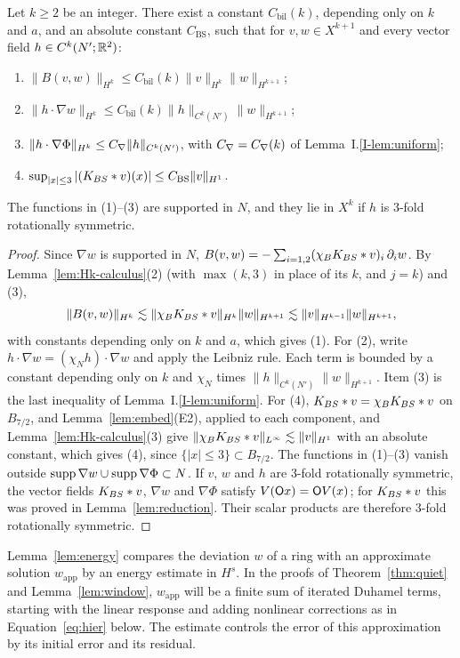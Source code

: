 \begin{lemma}
\label{lem:bilinear}
Let $k\ge2$ be an integer. There exist a constant $C_{\mathrm{bil}}(k)$,
depending only on $k$ and $a$, and an absolute constant
$C_{\mathrm{BS}}$, such that for $v,w\in X^{k+1}$ and every vector field
$h\in C^k(N';\mathbb{R}^2)$:
\begin{enumerate}[label=\textup{(\arabic*)}]
\item $\|B(v,w)\|_{H^k}\le C_{\mathrm{bil}}(k)\|v\|_{H^k}\|w\|_{H^{k+1}}$;
\item $\|h\cdot\nabla w\|_{H^k}\le C_{\mathrm{bil}}(k)\|h\|_{C^k(N')}\|w\|_{H^{k+1}}$;
\item $\|h\cdot\nabla\Phi\|_{H^k}\le C_{\nabla}\|h\|_{C^k(N')}$, with $C_{\nabla}=C_{\nabla}(k)$ of
  Lemma~I.\ref{I-lem:uniform};
\item $\sup_{|x|\le3}|(K_{BS}\ast v)(x)|\le C_{\mathrm{BS}}\|v\|_{H^1}$.
\end{enumerate}
The functions in \textup{(1)}--\textup{(3)} are supported in $N$, and they lie in
$X^k$ if $h$ is $3$-fold rotationally symmetric.
\end{lemma}
\begin{proof}
Since $\nabla w$ is supported in $N$,
$B(v,w)=-\sum_{i=1,2}(\chi_BK_{BS}\ast v)_i\,\partial_iw$. By
Lemma~\ref{lem:Hk-calculus}\textup{(2)} (with $\max(k,3)$ in place of its $k$, and
$j=k$) and \textup{(3)},
\[
\|B(v,w)\|_{H^k}\lesssim
\|\chi_BK_{BS}\ast v\|_{H^k}\|w\|_{H^{k+1}}
\lesssim\|v\|_{H^{k-1}}\|w\|_{H^{k+1}},
\]
with constants depending only on $k$ and $a$, which gives (1).
For (2), write $h\cdot\nabla w=(\chi_Nh)\cdot\nabla w$ and apply the
Leibniz rule. Each term is bounded by a constant depending only on $k$ and
$\chi_N$ times $\|h\|_{C^k(N')}\|w\|_{H^{k+1}}$.
Item (3) is the
last inequality of Lemma~I.\ref{I-lem:uniform}. For (4), $K_{BS}\ast v=\chi_BK_{BS}\ast v$ on
$B_{7/2}$, and Lemma~\ref{lem:embed}\textup{(E2)}, applied to each component, and
Lemma~\ref{lem:Hk-calculus}\textup{(3)} give
$\|\chi_BK_{BS}\ast v\|_{L^\infty}\lesssim\|v\|_{H^1}$ with an absolute constant,
which gives (4), since $\{|x|\le3\}\subset B_{7/2}$. The functions in
(1)--(3) vanish outside $\operatorname{supp}\nabla w\cup\operatorname{supp}\nabla\Phi\subset N$. If $v$, $w$ and
$h$ are $3$-fold rotationally symmetric, the vector fields $K_{BS}\ast v$,
$\nabla w$ and $\nabla\Phi$ satisfy $V(\mathsf{O} x)=\mathsf{O} V(x)$; for
$K_{BS}\ast v$ this was proved in Lemma~\ref{lem:reduction}.
Their scalar products are therefore $3$-fold rotationally symmetric.
\end{proof}

Lemma~\ref{lem:energy} compares the deviation $w$ of a ring with an
approximate solution $w_{\mathrm{app}}$ by an energy estimate in $H^s$.
In the proofs of Theorem~\ref{thm:quiet} and Lemma~\ref{lem:window},
$w_{\mathrm{app}}$ will be a finite sum of iterated Duhamel terms, starting
with the linear response and adding nonlinear corrections as in
Equation~\eqref{eq:hier} below. The estimate controls the error of this
approximation by its initial error and its residual.

